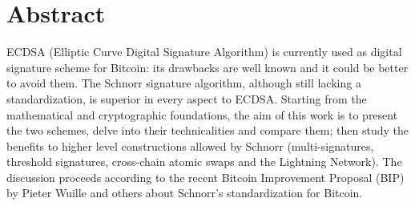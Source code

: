 \chapter{Abstract}
\label{chpr:abstract}
ECDSA (Elliptic Curve Digital Signature Algorithm) is currently used as digital signature scheme for Bitcoin: its drawbacks are well known and it could be better to avoid them. The Schnorr signature algorithm, although still lacking a standardization, is superior in every aspect to ECDSA. Starting from the mathematical and cryptographic foundations, the aim of this work is to present the two schemes, delve into their technicalities and compare them; then study the benefits to higher level constructions allowed by Schnorr (multi-signatures, threshold signatures, cross-chain atomic swaps and the Lightning Network). The discussion proceeds according to the recent Bitcoin Improvement Proposal (BIP) by Pieter Wuille and others about Schnorr's standardization for Bitcoin.
